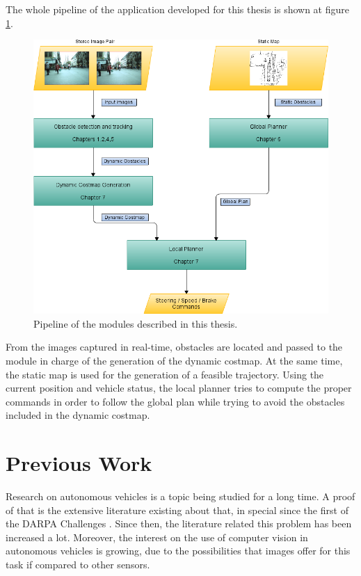  The whole pipeline of the application developed for this thesis is shown at figure \ref{fig:cp00_pipeline}. 
 
\begin{figure}[thb]
  \centering
  \includegraphics{pipeline}
  \caption{Pipeline of the modules described in this thesis.}\label{fig:cp00_pipeline}
\end{figure}

From the images captured in real-time, obstacles are located and passed to the module in charge of the generation of the dynamic costmap. At the same time, the static map is used for the generation of a feasible trajectory. Using the current position and vehicle status, the local planner tries to compute the proper commands in order to follow the global plan while trying to avoid the obstacles included in the dynamic costmap.

\section{Previous Work}\label{ch:chapter00_02}

Research on autonomous vehicles is a topic being studied for a long time. A proof of that is the extensive literature existing about that, in special since the first of the DARPA Challenges \citep{Buehler2007, Buehler2009}. Since then, the literature related this problem has been increased a lot. Moreover, the interest on the use of computer vision in autonomous vehicles is growing, due to the possibilities that images offer for this task if compared to other sensors.

